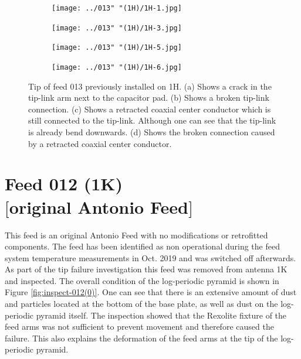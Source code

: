 \documentclass[12pt,a4paper,oneside]{article}
\begin{document}
\newpage
%
\begin{figure}[H]
    \centering
        \begin{subfigure}[t]{0.475\textwidth}
        \centering
        \texttt{[image: ../013" "(1H)/1H-1.jpg]}
        \caption{}
        \label{fig:}
   	 \end{subfigure}
        \begin{subfigure}[t]{0.475\textwidth}
        \centering
        \texttt{[image: ../013" "(1H)/1H-3.jpg]}
        \caption{}
        \label{fig:}
   	\end{subfigure}
   
 	\vspace{1mm}
   
        \begin{subfigure}[t]{0.475\textwidth}
        \centering
        \texttt{[image: ../013" "(1H)/1H-5.jpg]}
        \caption{}
        \label{fig:}
   	 \end{subfigure}
        \begin{subfigure}[t]{0.475\textwidth}
        \centering
        \texttt{[image: ../013" "(1H)/1H-6.jpg]}
        \caption{}
        \label{fig:}
  	\end{subfigure}  
    \caption{Tip of feed 013 previously installed on 1H. (a) Shows a crack in the tip-link arm next to the capacitor pad. (b) Shows a broken tip-link connection. (c) Shows a retracted coaxial center conductor which is still connected to the tip-link. Although one can see that the tip-link is already bend downwards. (d) Shows the broken connection caused by a retracted coaxial center conductor. }
    \label{fig:inspect-013(1)}
\end{figure}



\newpage
\section{Feed 012 (1K)\\$[$original Antonio Feed$]$}
\label{sec:5}

This feed is an original Antonio Feed with no modifications or retrofitted components. The feed has been identified as non operational during the feed system temperature measurements in Oct. 2019 and was switched off afterwards. As part of the tip failure investigation this feed was removed from antenna 1K and inspected. The overall condition of the log-periodic pyramid is shown in Figure \ref{fig:inspect-012(0)}. One can see that there is an extensive amount of dust and particles located at the bottom of the base plate, as well as dust on the log-periodic pyramid itself. The inspection showed that the Rexolite fixture of the feed arms was not sufficient to prevent movement and therefore caused the failure. This also explains the deformation of the feed arms at the tip of the log-periodic pyramid. 
\end{document}
